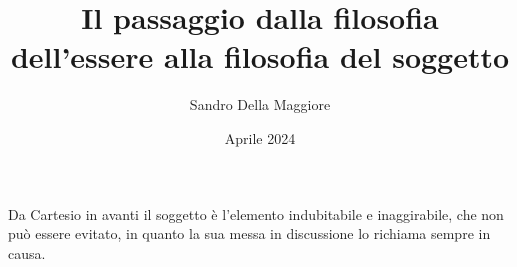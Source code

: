 \documentclass[a4paper,12pt,oneside]{article}%
\begin{document}
	\author{Sandro Della Maggiore}
	\title{Il passaggio dalla filosofia dell'essere alla filosofia del soggetto}
	\date{Aprile 2024}
	
	\maketitle

Da Cartesio in avanti il soggetto è l'elemento indubitabile e inaggirabile, che non può essere evitato, in quanto la sua messa in discussione lo richiama sempre in causa. 
	
\end{document}

